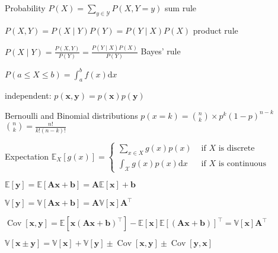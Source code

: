 \documentclass[UTF8,a4paper]{article}
\begin{document}
\begin{cheatsheetblock}{Probability}
    $P(X)=\sum_{y \in \mathscr{Y}} P(X, Y=y)$ \hfill sum rule

    $P(X, Y)=P(X \mid Y) P(Y)=P(Y \mid X) P(X)$ \hfill product rule

    $P(X \mid Y)=\frac{P(X, Y)}{P(Y)}=\frac{P(Y \mid X) P(X)}{P(Y)}$ \hfill Bayes' rule

    $P(a \leq X \leq b)=\int_{a}^{b} f(x) \mathrm{d} x$

    independent: $p(\mathbf{x}, \mathbf{y})=p(\mathbf{x}) p(\mathbf{y})$

\end{cheatsheetblock}

\begin{cheatsheetblock}{Bernoulli and Binomial distributions}
$p(x=k)= {n \choose k} \times p^k (1-p)^{n-k}$ \hfill ${n \choose k} = \frac{n!}{k!(n-k)!}$
\end{cheatsheetblock}

\begin{cheatsheetblock}{Expectation}
    $\mathbb{E}_X[g(x)]= \begin{cases}\sum_{x \in X} g(x) p(x) & \text { if } X \text { is discrete } \\ \int_\mathscr{X} g(x) p(x) \mathrm{d} x & \text { if } X \text { is continuous }\end{cases}$

    $\mathbb{E}[\bm{y}]=\mathbb{E}[\bm{A x}+\bm{b}]=\bm{A} \mathbb{E}[\bm{x}]+\bm{b}$

    $\mathbb{V}[\bm{y}]=\mathbb{V}[\bm{A} \bm{x}+\bm{b}]=\bm{A} \mathbb{V}[\bm{x}] \bm{A}^{\top}$

    $\operatorname{Cov}[\bm{x}, \bm{y}]=\mathbb{E}\left[\bm{x}(\bm{A} \bm{x}+\bm{b})^{\top}\right]-\mathbb{E}[\bm{x}] \mathbb{E}[(\bm{A} \bm{x}+\bm{b})]^{\top}=\mathbb{V}[\bm{x}] \bm{A}^{\top}$
    
    $\mathbb{V}[\mathbf{x} \pm \mathbf{y}]=\mathbb{V}[\mathbf{x}]+\mathbb{V}[\mathbf{y}] \pm \operatorname{Cov}[\mathbf{x}, \mathbf{y}] \pm \operatorname{Cov}[\mathbf{y}, \mathbf{x}]$
\end{cheatsheetblock}
\end{document}
